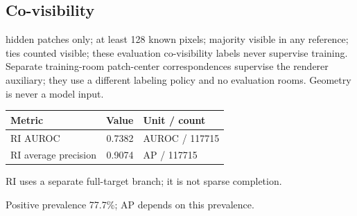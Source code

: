 \documentclass[10pt]{article}
\begin{document}
\subsection{Co-visibility}
hidden patches only; at least 128 known pixels; majority visible in any reference; ties counted visible; these evaluation co-visibility labels never supervise training. Separate training-room patch-center correspondences supervise the renderer auxiliary; they use a different labeling policy and no evaluation rooms. Geometry is never a model input.
\begin{center}\begin{tabular}{p{.57\linewidth}rp{.23\linewidth}}\toprule Metric & Value & Unit / count \\ \midrule
RI AUROC & 0.7382 & AUROC / 117715 \\
RI average precision & 0.9074 & AP / 117715 \\
\bottomrule\end{tabular}\end{center}
RI uses a separate full-target branch; it is not sparse completion.

Positive prevalence 77.7\%; AP depends on this prevalence.
\end{document}
